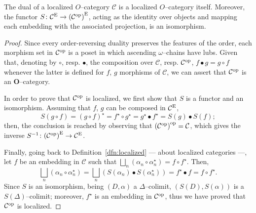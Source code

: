 \begin{prp}\label{iso:dual}
  The dual of a localized \(O\)--category \(\mathcal{C}\) is a localized \(O\)--category itself.
  Moreover, the functor
  \(
    S \colon \mathcal{C}^\textup{E} \to {(\mathcal{C}^\textup{op})}^\textup{E}
  \),
  acting as the identity over objects and mapping each embedding with the associated projection, is an isomorphism.
\end{prp}
\begin{proof}
  Since every order-reversing duality preserves the features of the order, each morphism set in \(\mathcal{C}^\textup{op}\) is a poset in which ascending \(\omega\)--chains have lubs. %
  Given that, denoting by \(\circ\), resp. \(\bullet\), the composition over \(\mathcal{C}\), resp. \(\mathcal{C}^\textup{op}\), \(f \bullet g = g \circ f\) whenever the latter is defined for \(f\), \(g\) morphisms of \(\mathcal{C}\), we can assert that \(\mathcal{C}^\textup{op}\) is an \(\mathbf{O}\)--category. %

  In order to prove that \(\mathcal{C}^\textup{op}\) is localized, we first show that \(S\) is a functor and an isomorphism. Assuming that \(f\), \(g\) can be composed in \(\mathcal{C}^\textup{E}\),
  \begin{equation*}
    S(g \circ f) = {(g \circ f)}^\star = f^\star \circ g^\star = g^\star \bullet f^\star = S(g) \bullet S(f);
  \end{equation*}
  then, the conclusion is reached by observing that \({(\mathcal{C}^\textup{op})}^\textup{op} = \mathcal{C}\), which gives the inverse \(S^{-1} \colon {(\mathcal{C}^\textup{op})}^\textup{E} \to \mathcal{C}^\textup{E}\).

  Finally, going back to Definition~\ref{dfn:localized} --- about localized categories ---, let \(f\) be an embedding in \(\mathcal{C}\) such that \(\bigsqcup_n(\alpha_n \circ \alpha_n^\star) = f \circ f^\star\). Then, %
  \begin{equation*}
    \bigsqcup_n(\alpha_n \circ \alpha_n^\star) =
    \bigsqcup_n(S(\alpha_n) \bullet S(\alpha_n^\star)) =
    f^\star \bullet f = f \circ f^\star.
  \end{equation*}
  Since \(S\) is an isomorphism, being \((D,\alpha)\) a \(\Delta\)--colimit, \((S(D),S(\alpha))\) is a \(S(\Delta)\)--colimit; moreover, \(f^\star\) is an embedding in \(\mathcal{C}^\textup{op}\), thus we have proved that \(\mathcal{C}^\textup{op}\) is localized. \qedhere %
\end{proof}

